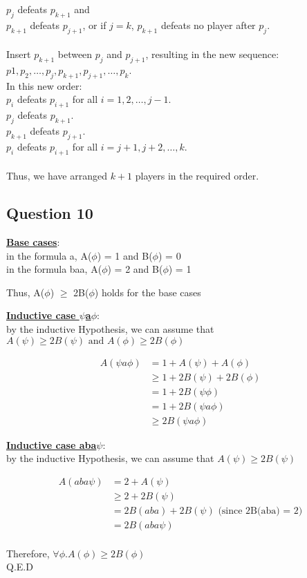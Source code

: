 \documentclass[11pt]{article}
\begin{document}
{{{$p_{j}$ defeats $p_{k+1}$ and \\
$p_{k+1}$ defeats $p_{j+1}$,
or if $j = k$, $p_{k+1}$ defeats no player after $p_j$.\\
\\
Insert $p_{k+1}$ between $p_j$ and $p_{j+1}$, resulting in the new sequence:\\
$p1, p_2, \ldots, p_j, p_{k+1}, p_{j+1}, \ldots, p_k$.\\
In this new order:\\
$p_i$ defeats $p_{i+1}$ for all $i = 1, 2, \ldots, j-1$.\\
$p_j$ defeats $p_{k+1}$.\\
$p_{k+1}$ defeats $p_{j+1}$.\\
$p_i$ defeats $p_{i+1}$ for all $i = j+1, j+2, \ldots, k$.\\
\\
Thus, we have arranged $k+1$ players in the required order.\\

\subsection*{Question 10}
\underline{\textbf{Base cases}}: \\
in the formula a,
A($\phi$) = 1 and B($\phi$) = 0 \\
in the formula baa,
A($\phi$) = 2 and B($\phi$) = 1

Thus, A($\phi$) $\geq$ 2B($\phi$) holds for the base cases

\noindent
\underline{\textbf{Inductive case $\psi$a$\phi$}}: \\
by the inductive Hypothesis, we can assume that
$A(\psi) \geq 2B(\psi) \text{ and } A(\phi) \geq 2B(\phi)$

\begin{align*}
    A(\psi a \phi) &= 1 + A(\psi) + A(\phi) \\
    &\geq 1 + 2B(\psi) + 2B(\phi) \\
    &= 1 + 2B(\psi \phi) \\
    &= 1 + 2B(\psi a \phi) \\
    &\geq 2B(\psi a \phi)
\end{align*}

\noindent
\underline{\textbf{Inductive case aba$\psi$}}: \\
by the inductive Hypothesis, we can assume that
$A(\psi) \geq 2B(\psi)$

\begin{align*}
    A(aba \psi) &= 2 + A(\psi) \\
    &\geq 2 + 2B(\psi) \\
    &= 2B(aba) + 2B(\psi) \text{ (since 2B(aba) = 2)} \\
    &= 2B(aba\psi)
\end{align*}
\\
Therefore, $\forall \phi . A(\phi) \geq 2B(\phi)$\\
Q.E.D
}}}
\end{document}
